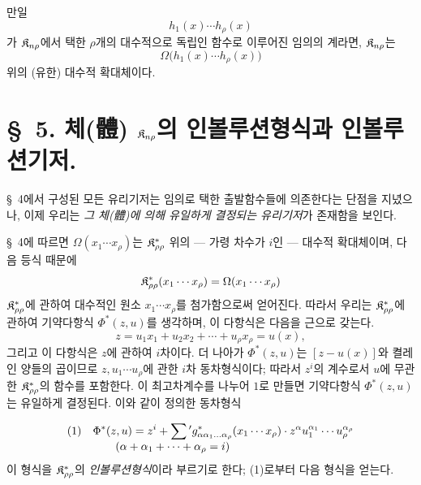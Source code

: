 만일
\[
h_1(x)\cdots h_\rho(x)
\]
가 $\mathfrak K_{n\rho}$에서 택한 $\rho$개의 대수적으로 독립인 함수로 이루어진 임의의 계라면, $\mathfrak K_{n\rho}$는
\[
\Omega\bigl(h_1(x)\cdots h_\rho(x)\bigr)
\]
위의 (유한) 대수적 확대체이다.

\section*{\S\ 5. 체(體) $\mathfrak K_{n\rho}$의 인볼루션형식과 인볼루션기저.}

\S\ 4에서 구성된 모든 유리기저는 임의로 택한 출발함수들에 의존한다는 단점을 지녔으나, 이제 우리는 \emph{그 체(體)에 의해 유일하게 결정되는 유리기저}가 존재함을 보인다.

\S\ 4에 따르면 $\Omega(x_1\cdots x_\rho)$는 $\mathfrak K^*_{\rho\rho}$ 위의 --- 가령 차수가 $i$인 --- 대수적 확대체이며, 다음 등식 때문에
\[
\mathfrak K^*_{\rho\rho}(x_1\cdots x_\rho)=\Omega(x_1\cdots x_\rho)
\]
$\mathfrak K^*_{\rho\rho}$에 관하여 대수적인 원소 $x_1\cdots x_\rho$를 첨가함으로써 얻어진다. 따라서 우리는 $\mathfrak K^*_{\rho\rho}$에 관하여 기약다항식 $\Phi^*(z,u)$를 생각하며, 이 다항식은 다음을 근으로 갖는다.
\[
z=u_1x_1+u_2x_2+\cdots+u_\rho x_\rho=u(x),
\]
그리고 이 다항식은 $z$에 관하여 $i$차이다. 더 나아가 $\Phi^*(z,u)$는 $[z-u(x)]$와 켤레인 양들의 곱이므로 $z,u_1\cdots u_\rho$에 관한 $i$차 동차형식이다; 따라서 $z^i$의 계수로서 $u$에 무관한 $\mathfrak K^*_{\rho\rho}$의 함수를 포함한다. 이 최고차계수를 나누어 $1$로 만들면 기약다항식 $\Phi^*(z,u)$는 유일하게 결정된다. 이와 같이 정의한 동차형식

\[
\begin{array}{@{}l@{\quad}l@{}}
(1)& \displaystyle \Phi^*(z,u)=z^i+\sum{}'g^*_{\alpha\alpha_1\ldots\alpha_\rho}(x_1\cdots x_\rho)\cdot
z^\alpha u_1^{\alpha_1}\cdots u_\rho^{\alpha_\rho}\\
& \displaystyle\qquad(\alpha+\alpha_1+\cdots+\alpha_\rho=i)
\end{array}
\]
이 형식을 $\mathfrak K^*_{\rho\rho}$의 \emph{인볼루션형식}이라 부르기로 한다; (1)로부터 다음 형식을 얻는다.

